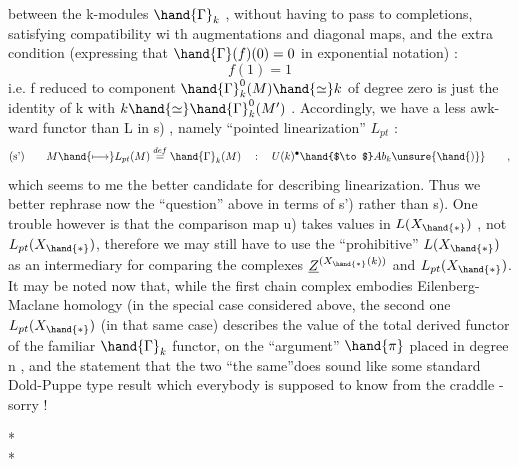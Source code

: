 
between the k-modules $\hand{\Gamma}_k$ ,  without having to pass to completions,
satisfying compatibility wi th augmentations and diagonal maps,  and
the extra condition  (expressing that $\hand{\Gamma}(f)(0) = 0$ \xout{)} in exponential
notation) :
\[ f(1) = 1 \]
i.e. f reduced to component  $\hand{\Gamma}_k^{0}(M)\hand{\simeq} k$  of degree zero is just
the identity of k with  $k\hand{\simeq}\hand{\Gamma}_k^{0}(M')$ .  Accordingly,  we have a less awk-%
ward  functor than L in \hand{(}s) ,  namely ``pointed linearization'' $L_{pt}$ :
\[ \text{(s')} \qquad M\hand{\longmapsto} L_{pt}(M)\overset{def}{=}\hand{\Gamma}_k(M) \quad : \quad U(k)^{\bullet}\hand{$\to$} Ab_k \unsure{\hand{)}} \qquad , \]
 which seems to me the better candidate for describing linearization.
Thus we better rephrase now the ``question'' above in terms of \hand{(}s') rather
than \hand{(}s).  One trouble however is that the comparison map \hand{(}u)  takes 
values in $L(X_{\hand{*}})$ ,  not $L_{pt}(X_{\hand{*}})$,  therefore we may still have to use
the ``prohibitive'' $L(X_{\hand{*}})$  as an intermediary for comparing  the complexes
$\underline{Z}^{(X_{\hand{*}}(k))}$  and $L_{pt}(X_{\hand{*}})$.  It may be noted now that,  while the first chain
 complex embodies  Eilenberg-Maclane homology   (in the special case
considered above\hand{)}, the second one  $L_{pt}(X_{\hand{*}})$  (in that same case) describes
the value of the total derived functor of the familiar $\hand{\Gamma}_k$ functor,  on
the ``argument'' $\hand{\pi}$ placed in degree n ,  and the statement that the two
``the same''does sound like some standard Dold-Puppe type result
which everybody is supposed to know from the craddle  - sorry !

\begin{center}
* \qquad *\\
*
\end{center}

